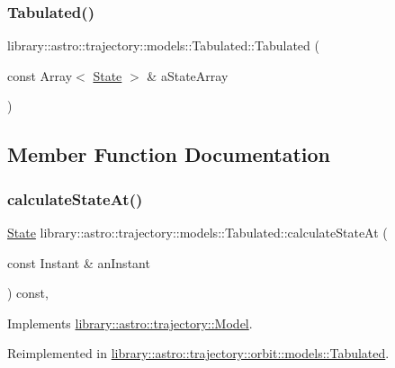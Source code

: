 \subsubsection{\texorpdfstring{Tabulated()}{Tabulated()}}
{\footnotesize\ttfamily library\+::astro\+::trajectory\+::models\+::\+Tabulated\+::\+Tabulated (\begin{DoxyParamCaption}\item[{const Array$<$ \hyperlink{classlibrary_1_1astro_1_1trajectory_1_1_state}{State} $>$ \&}]{a\+State\+Array }\end{DoxyParamCaption})}



\subsection{Member Function Documentation}
\mbox{\label{classlibrary_1_1astro_1_1trajectory_1_1models_1_1_tabulated_a6d23f5721930d9e885eb3b763ab3390a}} 
\subsubsection{\texorpdfstring{calculate\+State\+At()}{calculateStateAt()}}
{\footnotesize\ttfamily \hyperlink{classlibrary_1_1astro_1_1trajectory_1_1_state}{State} library\+::astro\+::trajectory\+::models\+::\+Tabulated\+::calculate\+State\+At (\begin{DoxyParamCaption}\item[{const Instant \&}]{an\+Instant }\end{DoxyParamCaption}) const\hspace{0.3cm}{\ttfamily [override]}, {\ttfamily [virtual]}}



Implements \hyperlink{classlibrary_1_1astro_1_1trajectory_1_1_model_acee9ee770c2ee1d1205b618e8f722ba4}{library\+::astro\+::trajectory\+::\+Model}.



Reimplemented in \hyperlink{classlibrary_1_1astro_1_1trajectory_1_1orbit_1_1models_1_1_tabulated_a43db203d7257d25a5a3a6f0e03e62b7d}{library\+::astro\+::trajectory\+::orbit\+::models\+::\+Tabulated}.

